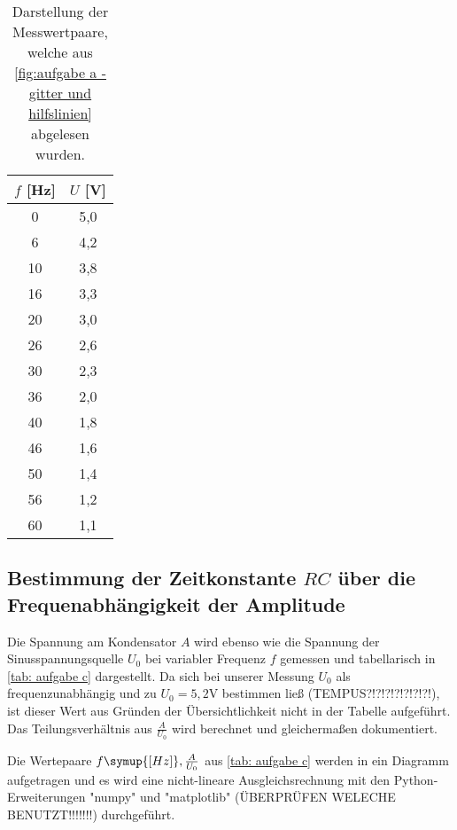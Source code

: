 \begin{table}
  \centering
  \caption{Darstellung der Messwertpaare, welche aus \autoref{fig:aufgabe a - gitter und hilfslinien} abgelesen wurden.}
  \label{tab:aufgabe a}
  \begin{tabular}{S[table-format=2.0] S[table-format=1.1]}
    \toprule
    {$f$ [Hz]} & {$U$ [V]} \\
     &  5,0 \\
    6	&  4,2 \\
    10 & 3,8 \\
    16 & 3,3 \\
    20 & 3,0 \\
    26 & 2,6 \\
    30 & 2,3 \\
    36 & 2,0 \\
    40 & 1,8 \\
    46 & 1,6 \\
    50 & 1,4 \\
    56 & 1,2 \\
    60 & 1,1 \\
    \bottomrule
  \end{tabular}
\end{table}


\subsection{Bestimmung der Zeitkonstante $RC$ über die Frequenabhängigkeit der Amplitude}
Die Spannung am Kondensator $A$ wird ebenso wie die Spannung der Sinusspannungsquelle $U_{0}$ bei variabler
Frequenz $f$ gemessen und tabellarisch in \autoref{tab: aufgabe c} dargestellt. Da sich bei unserer Messung $U_{0}$
als frequenzunabhängig und zu $U_{0} = 5,2$V bestimmen ließ (TEMPUS?!?!?!?!?!?!?!), ist dieser Wert aus Gründen der
Übersichtlichkeit nicht in der Tabelle aufgeführt. Das Teilungsverhältnis aus $\frac{A}{U_{0}}$ wird berechnet und
gleichermaßen dokumentiert.

Die Wertepaare {$f \symup{[Hz]}, \frac{A}{U_{0}}$} aus \autoref{tab: aufgabe c} werden in ein Diagramm aufgetragen
und es wird eine nicht-lineare Ausgleichsrechnung mit den Python-Erweiterungen "numpy"\cite{numpy} und 
"matplotlib"\cite{matplotlib} (ÜBERPRÜFEN WELECHE BENUTZT!!!!!!!) durchgeführt.

